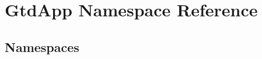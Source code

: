\section{Gtd\+App Namespace Reference}
\label{namespace_gtd_app}
\subsection*{Namespaces}
\begin{DoxyCompactItemize}
\end{DoxyCompactItemize}
